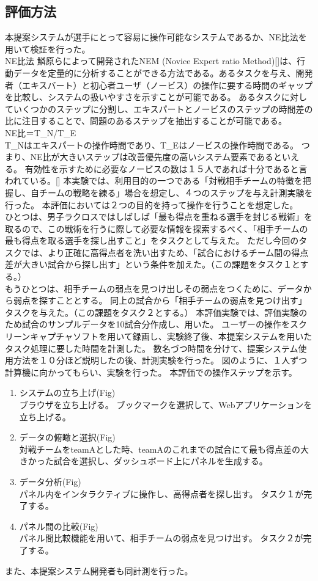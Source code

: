\documentclass[sotsuron]{kuee}
\begin{document}
\subsection{評価方法}
本提案システムが選手にとって容易に操作可能なシステムであるか、NE比法を用いて検証を行った。
\\NE比法
鱗原らによって開発されたNEM (Novice Expert ratio Method)[]は、行動データを定量的に分析することができる方法である。あるタスクを与え、開発者（エキスバート）と初心者ユーザ（ノービス）の操作に要する時間のギャップを比較し、システムの扱いやすさを示すことが可能である。
あるタスクに対していくつかのステップに分割し、エキスパートとノービスのステップの時間差の比に注目することで、問題のあるステップを抽出することが可能である。
\\NE比＝T\_N/T\_E
\\ T\_Nはエキスパートの操作時間であり、T\_Eはノービスの操作時間である。
つまり、NE比が大きいステップは改善優先度の高いシステム要素であるといえる。
有効性を示すために必要なノービスの数は１５人であれば十分であると言われている。[]
本実験では、利用目的の一つである「対戦相手チームの特徴を把握し、自チームの戦略を練る」場合を想定し、４つのステップを与え計測実験を行った。
本評価においては２つの目的を持って操作を行うことを想定した。
\\ひとつは、男子ラクロスではしばしば「最も得点を重ねる選手を封じる戦術」を取るので、この戦術を行うに際して必要な情報を探索するべく、「相手チームの最も得点を取る選手を探し出すこと」をタスクとして与えた。
ただし今回のタスクでは、より正確に高得点者を洗い出すため、「試合におけるチーム間の得点差が大きい試合から探し出す」という条件を加えた。（この課題をタスク１とする。）
\\もうひとつは、相手チームの弱点を見つけ出しその弱点をつくために、データから弱点を探すこととする。
同上の試合から「相手チームの弱点を見つけ出す」タスクを与えた。（この課題をタスク２とする。）
本評価実験では、評価実験のため試合のサンプルデータを10試合分作成し、用いた。
ユーザーの操作をスクリーンキャプチャソフトを用いて録画し、実験終了後、本提案システムを用いたタスク処理に要した時間を計測した。
数名づつ時間を分けて、提案システム使用方法を１０分ほど説明したの後、計測実験を行った。
図のように、１人ずつ計算機に向かってもらい、実験を行った。
本評価での操作ステップを示す。
	\begin{enumerate}
		\item システムの立ち上げ(Fig)
		\\ブラウザを立ち上げる。
		ブックマークを選択して、Webアプリケーションを立ち上げる。
		\item データの俯瞰と選択(Fig)
		\\対戦チームをteamAとした時、teamAのこれまでの試合にて最も得点差の大きかった試合を選択し、ダッシュボード上にパネルを生成する。
		\item データ分析(Fig)
		\\パネル内をインタラクティブに操作し、高得点者を探し出す。
		タスク１が完了する。
		\item パネル間の比較(Fig)
		\\パネル間比較機能を用いて、相手チームの弱点を見つけ出す。
		タスク２が完了する。
	\end{enumerate}
また、本提案システム開発者も同計測を行った。
\end{document}
